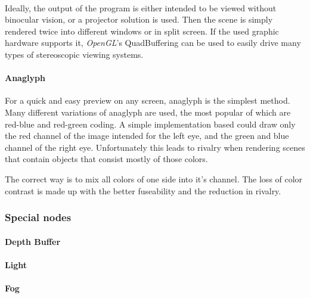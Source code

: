 \paragraph{}
Ideally, the output of the program is either intended to be viewed without binocular vision, or a projector solution is used.
Then the scene is simply rendered twice into different windows or in split screen.
If the used graphic hardware supports it, \textit{OpenGL}'s QuadBuffering can be used to easily drive many types of stereoscopic viewing systems.

\paragraph{Anaglyph}
For a quick and easy preview on any screen, anaglyph is the simplest method.
Many different variations of anaglyph are used, the most popular of which are red-blue and red-green coding.
A simple implementation based could draw only the red channel of the image intended for the left eye, and the green and blue channel of the right eye.
Unfortunately this leads to rivalry when rendering scenes that contain objects that consist mostly of those colors.

The correct way is to mix all colors of one side into it's channel.
The loss of color contrast is made up with the better fuseability and the reduction in rivalry.


\subsubsection{Special nodes\label{RendSpecial}}
\paragraph{}

\paragraph{Depth Buffer}
\paragraph{Light}
\paragraph{Fog}
